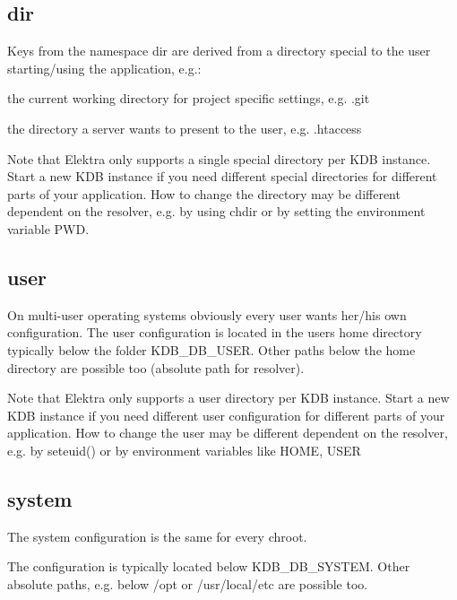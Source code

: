 \subsection*{dir}

Keys from the namespace {\ttfamily dir} are derived from a directory special to the user starting/using the application, e.\+g.\+:


\begin{DoxyItemize}
\item the current working directory for project specific settings, e.\+g. {\ttfamily .git}
\item the directory a server wants to present to the user, e.\+g. {\ttfamily .htaccess}
\end{DoxyItemize}

Note that Elektra only supports a single special directory per K\+DB instance. Start a new K\+DB instance if you need different special directories for different parts of your application. How to change the directory may be different dependent on the resolver, e.\+g. by using chdir or by setting the environment variable P\+WD.

\subsection*{user}

On multi-\/user operating systems obviously every user wants her/his own configuration. The user configuration is located in the users home directory typically below the folder K\+D\+B\+\_\+\+D\+B\+\_\+\+U\+S\+ER. Other paths below the home directory are possible too (absolute path for resolver).

Note that Elektra only supports a user directory per K\+DB instance. Start a new K\+DB instance if you need different user configuration for different parts of your application. How to change the user may be different dependent on the resolver, e.\+g. by seteuid() or by environment variables like H\+O\+ME, U\+S\+ER

\subsection*{system}

The system configuration is the same for every chroot.

The configuration is typically located below K\+D\+B\+\_\+\+D\+B\+\_\+\+S\+Y\+S\+T\+EM. Other absolute paths, e.\+g. below /opt or /usr/local/etc are possible too.

